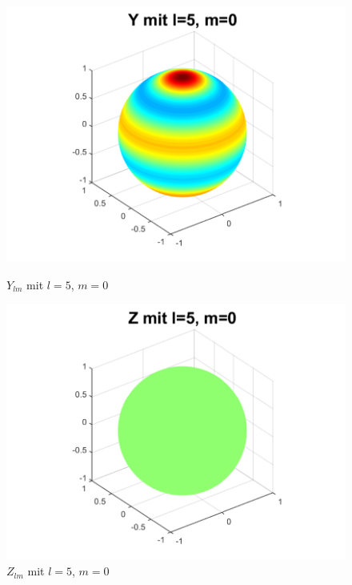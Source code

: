 \begin{refsection}
\begin{figure}
\begin{minipage}[hbt]{0.4\textwidth}
\centering
\includegraphics[width=1\textwidth]{kugel/ylm/a_5_0.pdf}
\caption{$Y_{lm}$ mit $l=5$, $m=0$}
\label{skript:ylm l=5 m=0}
\end{minipage}
\hfill
\begin{minipage}[hbt]{0.4\textwidth}
\centering
\includegraphics[width=1\textwidth]{kugel/ylm/b_5_0.pdf}
\caption{$Z_{lm}$ mit $l=5$, $m=0$}
\label{skript:zlm l=5 m=0}
\end{minipage}
\begin{minipage}[hbt]{0.4\textwidth}
\centering

\end{minipage}
\end{figure}
\end{refsection}
